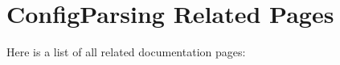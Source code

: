 \section{Config\-Parsing Related Pages}
Here is a list of all related documentation pages:\begin{CompactList}
\item {}

\end{CompactList}
